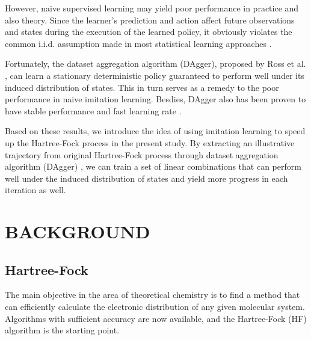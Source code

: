 \documentclass[twoside]{article}
\begin{document}


However, naive supervised learning may yield poor performance in practice and also theory.  Since the learner's prediction and action affect future observations and states during the execution of the learned policy, it obviously violates the common i.i.d. assumption made in most statistical learning approaches \cite{Ross}.



Fortunately, the dataset aggregation algorithm (DAgger), proposed by Ross et al. \cite{DAgger}, can learn a stationary deterministic policy guaranteed to perform well under its induced distribution of states. This in turn serves as a remedy to the poor performance in naive imitation learning. Besdies, DAgger also has been proven to have stable performance and fast learning rate \cite{DAggerCompare}.

Based on these results, we introduce the idea of using imitation learning to speed up the Hartree-Fock process in the present study. By extracting an illustrative trajectory from original Hartree-Fock process
through dataset aggregation algorithm (DAgger) \cite{DAgger}, we can train a set of linear combinations that can perform well under the induced distribution of states and yield more progress in each iteration as well. 


\section{BACKGROUND}

\subsection{Hartree-Fock}



The main objective in the area of theoretical chemistry is to find a method that can efficiently calculate the electronic distribution of any given molecular system. %
Algorithms with sufficient accuracy are now available, and the Hartree-Fock (HF) algorithm is the starting point.
\end{document}
